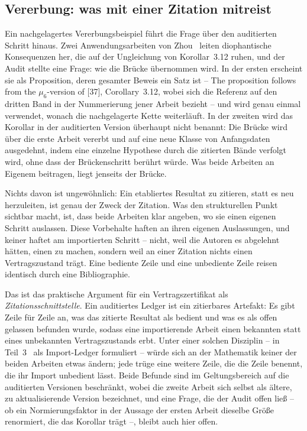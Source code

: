 \documentclass[11pt,a4paper]{article}
\begin{document}
\subsection{Vererbung: was mit einer Zitation mitreist}\label{sec:abc-inheritance}

Ein nachgelagertes Vererbungsbeispiel führt die Frage über den auditierten
Schritt hinaus. Zwei Anwendungsarbeiten von
Zhou~\cite{ZhouI,ZhouII} leiten diophantische Konsequenzen her, die auf der
Ungleichung von Korollar~3.12 ruhen, und der Audit stellte eine Frage: wie
die Brücke übernommen wird. In der ersten erscheint sie als Proposition,
deren gesamter Beweis ein Satz ist -- \glqq The proposition follows from the
$\mu_6$-version of [37], Corollary~3.12\grqq{}, wobei sich die Referenz auf den
dritten Band in der Nummerierung jener Arbeit bezieht -- und wird genau
einmal verwendet, wonach die nachgelagerte Kette weiterläuft. In der zweiten
wird das Korollar in der auditierten Version überhaupt nicht benannt: Die
Brücke wird über die erste Arbeit vererbt und auf eine neue Klasse von
Anfangsdaten ausgedehnt, indem eine einzelne Hypothese durch die zitierten
Bände verfolgt wird, ohne dass der Brückenschritt berührt würde. Was beide
Arbeiten an Eigenem beitragen, liegt jenseits der Brücke.

Nichts davon ist ungewöhnlich: Ein etabliertes Resultat zu zitieren, statt es
neu herzuleiten, ist genau der Zweck der Zitation. Was den strukturellen
Punkt sichtbar macht, ist, dass beide Arbeiten klar angeben, wo sie einen
eigenen Schritt auslassen. Diese Vorbehalte haften an ihren eigenen
Auslassungen, und keiner haftet am importierten Schritt -- nicht, weil die
Autoren es abgelehnt hätten, einen zu machen, sondern weil an einer Zitation
nichts einen Vertragszustand trägt. Eine bediente Zeile und eine unbediente
Zeile reisen identisch durch eine Bibliographie.

Das ist das praktische Argument für ein Vertragszertifikat als
\emph{Zitationsschnittstelle}. Ein auditiertes Ledger ist ein zitierbares
Artefakt: Es gibt Zeile für Zeile an, was das zitierte Resultat als bedient
und was es als offen gelassen befunden wurde, sodass eine importierende
Arbeit einen bekannten statt eines unbekannten Vertragszustands erbt. Unter
einer solchen Disziplin -- in Teil~3~\cite{part3} als Import-Ledger
formuliert -- würde sich an der Mathematik keiner der beiden Arbeiten etwas
ändern; jede trüge eine weitere Zeile, die die Zeile benennt, die ihr Import
unbedient lässt. Beide Befunde sind im Geltungsbereich auf die auditierten Versionen beschränkt,
wobei die zweite Arbeit sich selbst als ältere, zu aktualisierende Version
bezeichnet, und eine Frage, die der Audit offen ließ -- ob ein
Normierungsfaktor in der Aussage der ersten Arbeit dieselbe Größe
renormiert, die das Korollar trägt --, bleibt auch hier offen.
\end{document}
